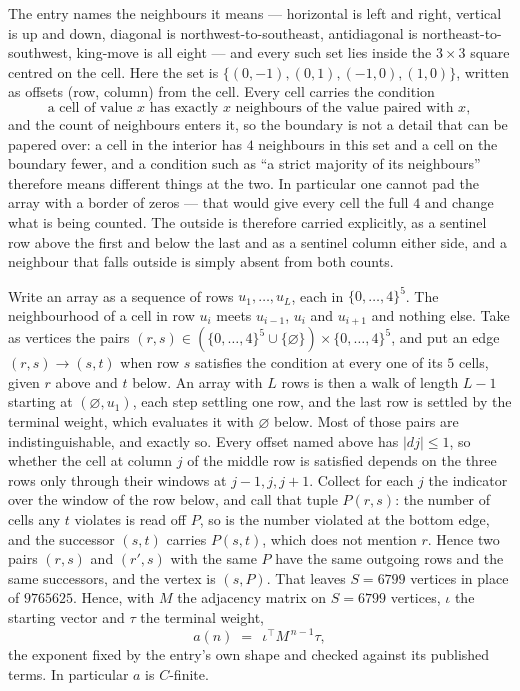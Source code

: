 \documentclass[11pt,a4paper]{article}
\theoremstyle{plain}
\theoremstyle{definition}
\begin{document}
The entry names the neighbours it means --- horizontal is left and right, vertical is up and
down, diagonal is northwest-to-southeast, antidiagonal is northeast-to-southwest, king-move is
all eight --- and every such set lies inside the $3\times3$ square centred on the cell. Here
the set is $\{(0,-1), (0,1), (-1,0), (1,0)\}$, written as offsets (row, column) from the cell. Every cell carries
the condition
\[
\text{a cell of value }x\text{ has exactly }x\text{ neighbours of the value paired with }x,
\]
and the count of neighbours enters it, so the boundary is not a detail that can be papered
over: a cell in the interior has $4$ neighbours in this set and a cell on the boundary
fewer, and a condition such as ``a strict majority of its neighbours'' therefore means
different things at the two. In particular one cannot pad the array with a border of zeros ---
that would give every cell the full $4$ and change what is being counted. The outside is
therefore carried
explicitly, as a sentinel row above the first and below the last and as a sentinel column
either side, and a neighbour that falls outside is simply absent from both counts.

Write an array as a sequence of rows $u_1,\dots,u_L$, each in
$\{0,\dots,4\}^{5}$. The neighbourhood of a cell in row $u_i$ meets $u_{i-1}$,
$u_i$ and $u_{i+1}$ and nothing else. Take as vertices the pairs
$(r,s)\in(\{0,\dots,4\}^{5}\cup\{\varnothing\})\times\{0,\dots,4\}^{5}$,
and put an edge $(r,s)\to(s,t)$ when row $s$ satisfies the condition at every one of its
$5$ cells, given $r$ above and $t$ below. An array with $L$ rows is then a walk of length
$L-1$ starting at $(\varnothing,u_1)$, each step settling one row, and the last row is
settled by the terminal weight, which evaluates it with $\varnothing$ below. Most of those pairs are indistinguishable, and exactly so. Every offset named above has $|dj|\le 1$, so whether the cell at column $j$ of the middle row is satisfied depends on the three rows only through their windows at $j-1,j,j+1$. Collect for each $j$ the indicator over the window of the row below, and call that tuple $P(r,s)$: the number of cells any $t$ violates is read off $P$, so is the number violated at the bottom edge, and the successor $(s,t)$ carries $P(s,t)$, which does not mention $r$. Hence two pairs $(r,s)$ and $(r',s)$ with the same $P$ have the same outgoing rows and the same successors, and the vertex is $(s,P)$. That leaves $S=6799$ vertices in place of $9765625$. Hence,
with $M$ the adjacency matrix on $S=6799$ vertices, $\iota$ the starting vector and $\tau$ the
terminal weight,
\[
a(n)\;=\;\,\iota^{\!\top}M^{\,n-1}\tau ,
\]
the exponent fixed by the entry's own shape and checked against its published terms. In
particular $a$ is $C$-finite.
\end{document}
